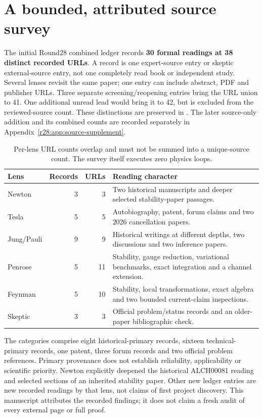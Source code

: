 \section{A bounded, attributed source survey}
The initial Round28 combined ledger records \textbf{30 formal readings at 38 distinct recorded URLs}. A record is one expert-source entry or skeptic external-source entry, not one completely read book or independent study. Several lenses revisit the same paper; one entry can include abstract, PDF and publisher URLs. Three separate screening/reopening entries bring the URL union to 41. One additional unread lead would bring it to 42, but is excluded from the reviewed-source count. These distinctions are preserved in . The later source-only addition and its combined counts are recorded separately in Appendix~\ref{r28:app:source-supplement}.

\begin{table}[ht]\centering\small
\begin{tabularx}{\textwidth}{@{}p{23mm}rrX@{}}
\toprule Lens & Records & URLs & Reading character \\
\midrule
Newton & 3 & 3 & Two historical manuscripts and deeper selected stability-paper passages.\\
Tesla & 5 & 5 & Autobiography, patent, forum claims and two 2026 cancellation papers.\\
Jung/Pauli & 9 & 9 & Historical writings at different depths, two discussions and two inference papers.\\
Penrose & 5 & 11 & Stability, gauge reduction, variational benchmarks, exact integration and a channel extension.\\
Feynman & 5 & 10 & Stability, local transformations, exact algebra and two bounded current-claim inspections.\\
Skeptic & 3 & 3 & Official problem/status records and an older-paper bibliographic check.\\
\bottomrule
\end{tabularx}
\caption{Per-lens URL counts overlap and must not be summed into a unique-source count. The survey itself executes zero physics loops.}
\end{table}

The categories comprise eight historical-primary records, sixteen technical-primary records, one patent, three forum records and two official problem references. Primary provenance does not establish reliability, applicability or scientific priority. Newton explicitly deepened the historical ALCH00081 reading and selected sections of an inherited stability paper. Other new ledger entries are new recorded readings by that lens, not claims of first project discovery. This manuscript attributes the recorded findings; it does not claim a fresh audit of every external page or full proof.

